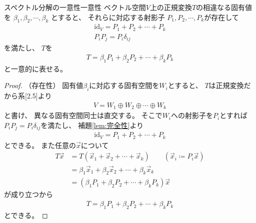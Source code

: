 \documentclass[a4paper, 10pt]{jsarticle}
\newcommand{\id}{\mathrm{id}}
\begin{document}
\begin{thm}{スペクトル分解の一意性}{一意性}
	ベクトル空間$V$上の正規変換$T$の相違なる固有値を
	$\beta_1, \beta_2, \cdots, \beta_k$
	とすると、
	それらに対応する射影子
	$P_1, P_2, \cdots, P_k$が存在して
	\begin{gather}
		\id_V = P_1 + P_2 + \cdots + P_k \\
		P_i P_j = P_i \delta_{ij}
	\end{gather}
	を満たし、
	$T$を
	\begin{align}
		T = \beta_1 P_1 + \beta_2 P_2 + \cdots + \beta_k P_k
	\end{align}
	と一意的に表せる。
\end{thm}
\begin{proof}
	（存在性）
	固有値$\beta_i$に対応する固有空間を$W_i$とすると、
	$T$は正規変換だから系[2.5]より
	\begin{align}
		V = W_1 \oplus W_2 \oplus \cdots \oplus W_k
	\end{align}
	と書け、
	異なる固有空間同士は直交する。
	そこで$W_i$への射影子を$P_i$とすれば
	$P_i P_j = P_i \delta_{ij}$を満たし、
	補題\ref{lem:完全性}より
	\begin{align}
		\id_V = P_1 + P_2 + \cdots + P_k
	\end{align}
	とできる。
	また任意の$\vec{x}$について
	\begin{align}
		T \vec{x}
		&= T \left( \vec{x}_1 + \vec{x}_2 + \cdots + \vec{x}_k \right)
		\qquad \left( \vec{x}_i \coloneqq P_i \vec{x} \right) \\
		&= \beta_1 \vec{x}_1 + \beta_2 \vec{x}_2 + \cdots
		+ \beta_k \vec{x}_k \\
		&= \left( \beta_1 P_1 + \beta_2 P_2 + \cdots + \beta_k P_k \right)
		\vec{x}
	\end{align}
	が成り立つから
	\begin{align}
		T = \beta_1 P_1 + \beta_2 P_2 + \cdots + \beta_k P_k
	\end{align}
	とできる。


\end{proof}
\end{document}
